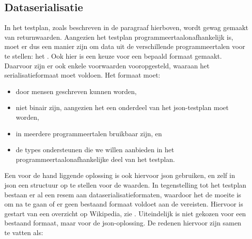 \subsection{Dataserialisatie}\label{subsec:dataserialisatie}

In het testplan, zoals beschreven in de paragraaf hierboven, wordt gewag gemaakt van returnwaarden.
Aangezien het testplan programmeertaalonafhankelijk is, moet er dus een manier zijn om data uit de verschillende programmeertalen voor te stellen: het .
Ook hier is een keuze voor een bepaald formaat gemaakt.
Daarvoor zijn er ook enkele voorwaarden vooropgesteld, waaraan het serialisatieformaat moet voldoen.
Het formaat moet:

\begin{itemize}
    \item door mensen geschreven kunnen worden,
    \item niet binair zijn, aangezien het een onderdeel van het json-testplan moet worden,
    \item in meerdere programmeertalen bruikbaar zijn, en
    \item de types ondersteunen die we willen aanbieden in het programmeertaalonafhankelijke deel van het testplan.
\end{itemize}

Een voor de hand liggende oplossing is ook hiervoor json gebruiken, en zelf in json een structuur op te stellen voor de waarden.
In tegenstelling tot het testplan bestaan er al een resem aan dataserialisatieformaten, waardoor het de moeite is om na te gaan of er geen bestaand formaat voldoet aan de vereisten.
Hiervoor is gestart van een overzicht op Wikipedia, zie \autocite{wiki2020}.
Uiteindelijk is niet gekozen voor een bestaand formaat, maar voor de json-oplossing.
De redenen hiervoor zijn samen te vatten als:

